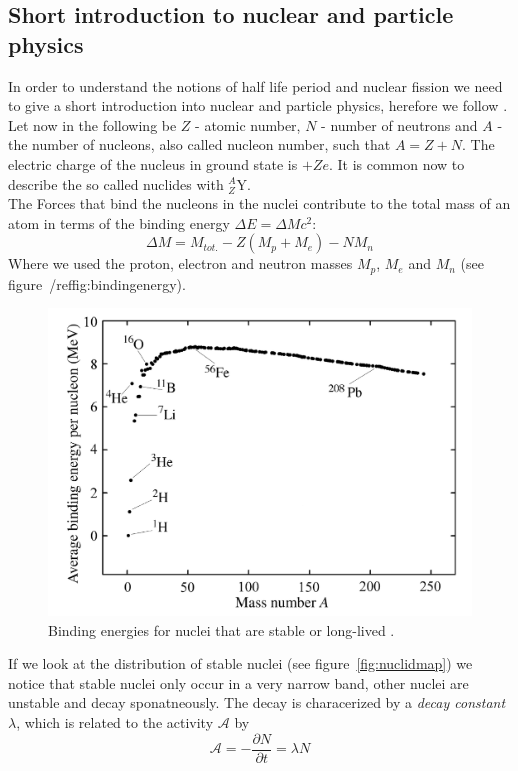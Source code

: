 \subsection{Short introduction to nuclear and particle physics}
In order to understand the notions of half life period and nuclear fission we need to
give a short introduction into nuclear and particle physics, herefore we follow \cite{Hooshyar}.
Let now in the following be $Z$ - atomic number,  $N$ - number of neutrons and  $A$ - the number of nucleons, also
called nucleon number, such that $A = Z + N$. The electric charge of the nucleus in ground state is $+Z e$.
It is common now to describe the so called nuclides with $_{Z}^{A}\textrm{Y}$.\\
The Forces that bind the nucleons in the nuclei contribute to the total mass of an atom in terms of the 
binding energy $\Delta E = \Delta M c^2$:
\begin{equation}
\Delta M = M_{tot.} - Z(M_p + M_e) - N M_n
\end{equation}
Where we used the proton, electron and neutron masses $M_p$, $M_e$ and $M_n$ 
(see figure~/ref{fig:bindingenergy}).
\begin{figure}[htpb]
    \centering
    \includegraphics[width=0.8\linewidth]{figures/bindingenergy}
    \caption{Binding energies for nuclei that are stable or long-lived \cite{Hooshyar}.}
    \label{fig:bindingenergy}
\end{figure}
If we look at the distribution of stable nuclei (see figure~\ref{fig:nuclidmap}) we notice
that stable nuclei only occur in a very narrow band, other nuclei are unstable and decay sponatneously.
The decay is characerized by a \textit{decay constant} $\lambda$, which is related to the activity $\mathcal{A}$
by 
\begin{equation}\label{eq:decay}
    \mathcal{A} = -\frac{\partial N}{\partial t} = \lambda N 
\end{equation}
